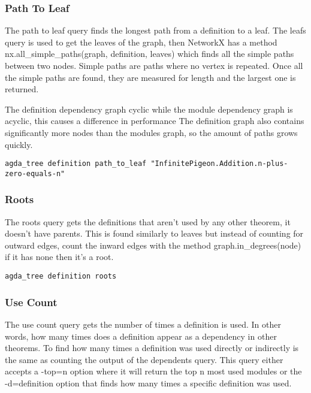 \subsubsection{Path To Leaf}

The path to leaf query finds the longest path from a definition to a leaf. The
leafs query is used to get the leaves of the graph, then NetworkX has a
method \textsf{nx.all\_simple\_paths(graph, definition, leaves)} which finds all
the simple paths between two nodes. Simple paths are paths where no vertex is
repeated. Once all the simple paths are found, they are measured for length and
the largest one is returned.

The definition dependency graph cyclic while the module dependency graph is
acyclic, this causes a difference in performance  The definition graph also
contains significantly more nodes than the modules graph, so the amount of
paths grows quickly.

\begin{lstlisting}
agda_tree definition path_to_leaf "InfinitePigeon.Addition.n-plus-zero-equals-n"
\end{lstlisting}

\subsubsection{Roots}

The roots query gets the definitions that aren't used by any other theorem, it
doesn't have parents. This is found similarly to leaves but instead of counting
for outward edges, count the inward edges with the method \linebreak
\textsf{graph.in\_degrees(node)} if it has none then it's a root.

\begin{lstlisting}
agda_tree definition roots
\end{lstlisting}

\subsubsection{Use Count}

The use count query gets the number of times a definition is used. In other
words, how many times does a definition appear as a dependency in other
theorems. To find how many times a definition was used directly or indirectly
is the same as counting the output of the dependents query. This query either
accepts a -top=n option where it will return the top n most used modules or the
-d=definition option that finds how many times a specific definition was used.

